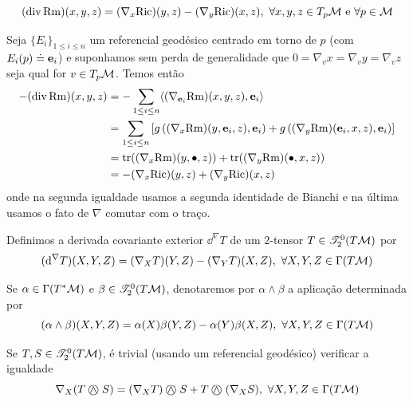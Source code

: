     \begin{lema}\label{divrm}
        \[
       (\operatorname{div} \mathrm{Rm})(x, y, z)= (\nabla_x \mathrm{Ric})(y, z) - (\nabla_ y \mathrm{Ric})(x, z), \ \forall x, y, z \in T_p \mathcal{M} \text{ e } \forall p \in \mathcal{M} \] 
       \end{lema}
       \begin{demm}
       Seja $\{E_i \}_{1 \leq i \leq n}$ um referencial geodésico centrado em torno de $p$ (com $E_i(p) \doteq \mathbf{e}_i$) e suponhamos sem perda de generalidade  que $0 = \nabla_{v} x = \nabla_{v} y = \nabla_v z$ seja qual for $v \in T_p \mathcal{M}$. Temos então
       \[\begin{aligned}
       - (\operatorname{div} \mathrm{Rm})(x, y, z) &= - \sum_{1 \leq i \leq n} \langle (\nabla_{\mathbf{e}_i} \mathrm{Rm})(x, y, z), \mathbf{e}_i \rangle \\
       &= \sum_{1 \leq i \leq n} \left[ g \left( (\nabla_x \mathrm{Rm})(y, \mathbf{e}_i, z), \mathbf{e}_i \right) +  g \left( (\nabla_y \mathrm{Rm})(\mathbf{e}_i, x, z), \mathbf{e}_i \right)\right] \\
       &= \operatorname{tr}((\nabla_x \mathrm{Rm})(y, \bullet, z)) + \operatorname{tr}((\nabla_y \mathrm{Rm})(\bullet, x, z)) \\
       &= -(\nabla_x \mathrm{Ric})(y, z) + (\nabla_y \mathrm{Ric})(x, z)
       \end{aligned}
       \]
       onde na segunda igualdade usamos a segunda identidade de Bianchi e na última usamos o fato de $\nabla$ comutar com o traço.
       \end{demm}

       \begin{deff}
        Definimos a derivada covariante exterior $\dd^{\nabla} T$ de um $2$-tensor $T \in \mathscr{T}^0_2(T \mathcal{M})$ por
        \[
        (\mathrm{d}^{\nabla} T)(X, Y, Z) = (\nabla_X T)(Y, Z) - (\nabla_Y T)(X, Z), \ \forall X, Y, Z \in \Gamma(T \mathcal{M})
        \]
        \end{deff}
        \begin{deff}
        Se $\alpha \in \Gamma(T^{*} \mathcal{M})$ e $\beta \in \mathscr{T}^0_2(T \mathcal{M})$, denotaremos por $\alpha \wedge \beta$ a aplicação determinada por
        \[
        (\alpha \wedge \beta)(X, Y, Z) = \alpha(X) \beta(Y, Z) - \alpha(Y) \beta(X, Z), \ \forall X, Y, Z \in \Gamma(T \mm)
        \]
        \end{deff} 
        
        \begin{oobs}
        Se $T, S \in \mathscr{T}^0_2(T \mathcal{M})$, é trivial (usando um referencial geodésico) verificar a igualdade
        \[
        \nabla_X (T \KN S) = (\nabla_X T) \KN S + T \KN (\nabla_X S), \ \forall X, Y, Z \in \Gamma(T \mm)
        \]
        \end{oobs}
        
